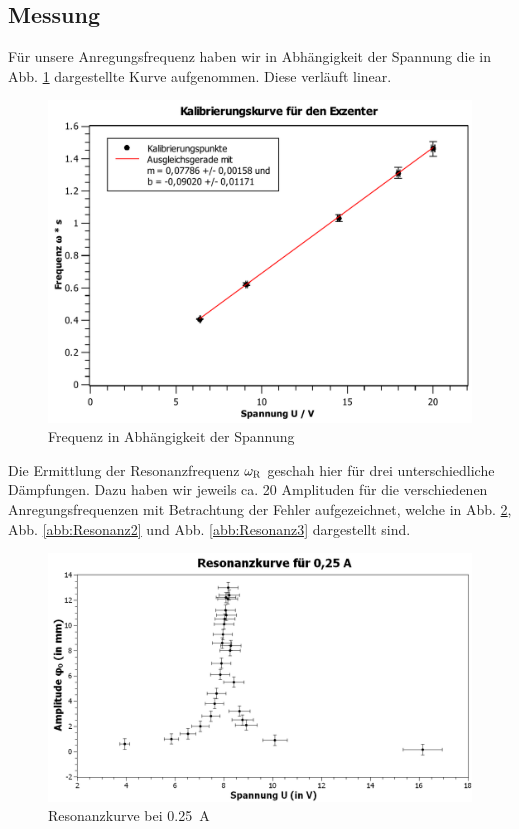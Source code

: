 \documentclass[11pt,a4paper,titlepage, ngerman]{article}
\newcommand{\refabb}[1]{Abb. \ref{abb:#1}}
\begin{document}
		\subsection*{Messung}
			
			Für unsere Anregungsfrequenz haben wir in Abhängigkeit der Spannung die in \refabb{Kalibrierkurve} dargestellte Kurve aufgenommen. Diese verläuft linear.			
			\begin{figure}[ht]
				\includegraphics[width=\textwidth]{Kalibrierungskurve.pdf}
				\caption{Frequenz in Abhängigkeit der Spannung}
				\label{abb:Kalibrierkurve}
			\end{figure}
			Die Ermittlung der Resonanzfrequenz  $\omega_\textsc{R}$ geschah hier für drei unterschiedliche Dämpfungen. Dazu haben wir jeweils ca. 20 Amplituden für die verschiedenen Anregungsfrequenzen mit Betrachtung der Fehler aufgezeichnet, welche in \refabb{Resonanz1}, \refabb{Resonanz2} und \refabb{Resonanz3} dargestellt sind. 
			\begin{figure}[ht]
				\includegraphics[width=\textwidth]{Resonanzkurve0,25A.png}
				\caption{Resonanzkurve bei \SI{0,25}{\A}}
				\label{abb:Resonanz1}
			\end{figure}
\end{document}
